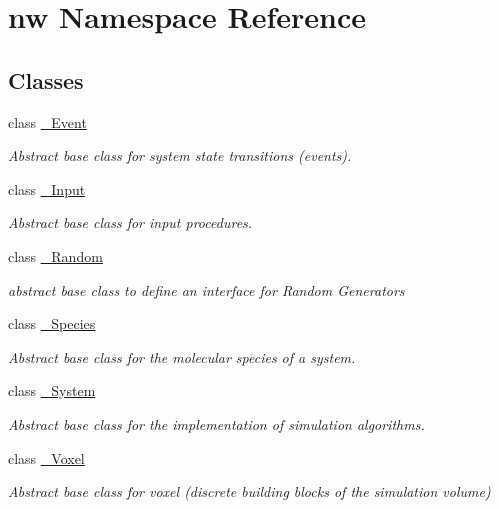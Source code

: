 \hypertarget{namespacenw}{\section{nw Namespace Reference}
\label{namespacenw}
}
\subsection*{Classes}
\begin{DoxyCompactItemize}
\item 
class \hyperlink{classnw_1_1___event}{\+\_\+\+Event}
\begin{DoxyCompactList}\small\item\em Abstract base class for system state transitions (events). \end{DoxyCompactList}\item 
class \hyperlink{classnw_1_1___input}{\+\_\+\+Input}
\begin{DoxyCompactList}\small\item\em Abstract base class for input procedures. \end{DoxyCompactList}\item 
class \hyperlink{classnw_1_1___random}{\+\_\+\+Random}
\begin{DoxyCompactList}\small\item\em abstract base class to define an interface for Random Generators \end{DoxyCompactList}\item 
class \hyperlink{classnw_1_1___species}{\+\_\+\+Species}
\begin{DoxyCompactList}\small\item\em Abstract base class for the molecular species of a system. \end{DoxyCompactList}\item 
class \hyperlink{classnw_1_1___system}{\+\_\+\+System}
\begin{DoxyCompactList}\small\item\em Abstract base class for the implementation of simulation algorithms. \end{DoxyCompactList}\item 
class \hyperlink{classnw_1_1___voxel}{\+\_\+\+Voxel}
\begin{DoxyCompactList}\small\item\em Abstract base class for voxel (discrete building blocks of the simulation volume) \end{DoxyCompactList}\item 

\end{DoxyCompactItemize}

